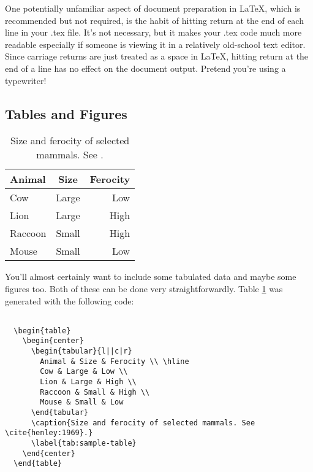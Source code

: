 One potentially unfamiliar aspect of document preparation in \LaTeX, 
which is recommended but not required, is the habit of hitting return at the
end of each line in your .tex file. It's not necessary, but it makes your
.tex code much more readable especially if someone is viewing it in a 
relatively old-school text editor. Since carriage returns are just treated as
a space in \LaTeX, hitting return at the end of a line has no effect on the
document output. Pretend you're using a typewriter!

\subsection{Tables and Figures}

\begin{table}
  \begin{center}
    \begin{tabular}{l||c|r}
      Animal & Size & Ferocity \\ \hline
      Cow & Large & Low \\
      Lion & Large & High \\
      Raccoon & Small & High \\
      Mouse & Small & Low
    \end{tabular}
    \caption{Size and ferocity of selected mammals. See \cite{henley:1969}.}
    \label{tab:sample-table}
  \end{center}
\end{table}

   

You'll almost certainly want to include some tabulated data and maybe some
figures too. Both of these can be done very straightforwardly. Table
\ref{tab:sample-table} was generated with the following code:

\pagebreak

\begin{verbatim}

  \begin{table}
    \begin{center}
      \begin{tabular}{l||c|r}
        Animal & Size & Ferocity \\ \hline
        Cow & Large & Low \\
        Lion & Large & High \\
        Raccoon & Small & High \\
        Mouse & Small & Low
      \end{tabular}
      \caption{Size and ferocity of selected mammals. See \cite{henley:1969}.}
      \label{tab:sample-table}
    \end{center}
  \end{table}

\end{verbatim}

